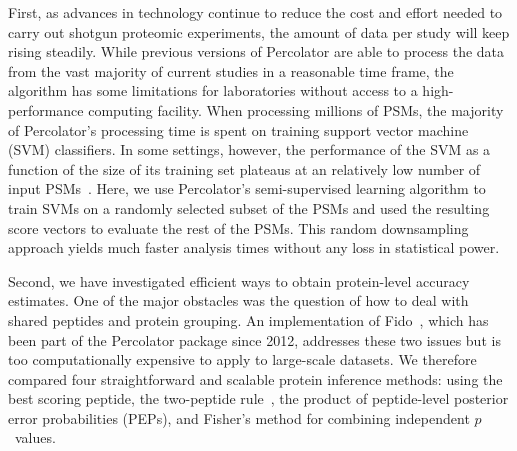 \documentclass{article}
\begin{document}
First, as advances in technology continue to reduce the cost and
effort needed to carry out shotgun proteomic experiments, the amount
of data per study will keep rising steadily. While previous versions
of Percolator are able to process the data from the vast majority of
current studies in a reasonable time frame, the algorithm has some
limitations for laboratories without access to a high-performance
computing facility. When processing millions of PSMs, the majority of
Percolator's processing time is spent on training support vector
machine (SVM) classifiers.  In some settings, however, the performance
of the SVM as a function of the size of its training set plateaus at
an relatively low number of input PSMs~\cite{gonnelli2015decoy}. Here,
we use Percolator's semi-supervised learning algorithm to train SVMs
on a randomly selected subset of the PSMs and used the resulting score
vectors to evaluate the rest of the PSMs.  This random downsampling
approach yields much faster analysis times without any loss in
statistical power.

Second, we have investigated efficient ways to obtain protein-level 
accuracy estimates. One of the major obstacles was the question of how 
to deal with shared peptides and protein grouping. An implementation 
of Fido~\cite{serang2010efficient}, which has been part of the 
Percolator package since 2012, addresses these two issues but is too 
computationally expensive to apply to large-scale datasets. We 
therefore compared four straightforward and scalable protein inference 
methods: using the best scoring peptide, the two-peptide 
rule~\cite{carr2004need, gupta2009false},
the product of peptide-level posterior error probabilities (PEPs), and
Fisher's method for combining independent $p$~values.
\end{document}
